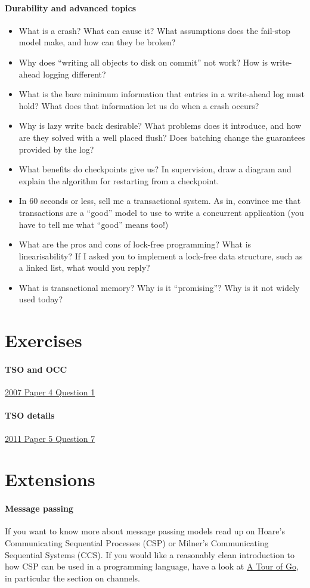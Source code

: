 \documentclass[12pt,a4paper,oneside,openright]{report}
\newcommand{\question}[2]{\paragraph{#1} #2}
\begin{document}
\question{Durability and advanced topics}{
  \begin{itemize}
  \item What is a crash? What can cause it? What assumptions does the
    fail-stop model make, and how can they be broken?
  \item Why does ``writing all objects to disk on commit'' not work?
    How is write-ahead logging different?
  \item What is the bare minimum information that entries in a
    write-ahead log must hold? What does that information let us do
    when a crash occurs?
  \item Why is lazy write back desirable? What problems does it
    introduce, and how are they solved with a well placed flush? Does
    batching change the guarantees provided by the log?
  \item What benefits do checkpoints give us? In supervision, draw a
    diagram and explain the algorithm for restarting from a
    checkpoint.
  \item In 60 seconds or less, sell me a transactional system. As in,
    convince me that transactions are a ``good'' model to use to write
    a concurrent application (you have to tell me what ``good'' means
    too!)
  \item What are the pros and cons of lock-free programming? What is
    linearisability? If I asked you to implement a lock-free data
    structure, such as a linked list, what would you reply?
  \item What is transactional memory? Why is it ``promising''? Why is
    it not widely used today?
  \end{itemize}
}


\section{Exercises}

\question{TSO and
  OCC}{\href{https://www.cl.cam.ac.uk/teaching/exams/pastpapers/y2007p4q1.pdf}{2007
    Paper 4 Question 1}}

\question{TSO
  details}{\href{https://www.cl.cam.ac.uk/teaching/exams/pastpapers/y2011p5q7.pdf}{2011
    Paper 5 Question 7}}

\section{Extensions}

\question{Message passing}{If you want to know more about message
  passing models read up on Hoare's Communicating Sequential Processes
  (CSP) or Milner's Communicating Sequential Systems (CCS). If you
  would like a reasonably clean introduction to how CSP can be used in
  a programming language, have a look at
  \href{https://tour.golang.org}{A Tour of Go}, in particular the
  section on channels.}
\end{document}
